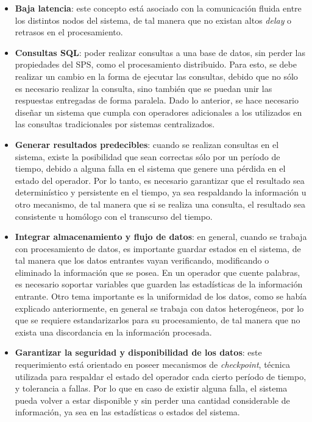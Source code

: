 \begin{itemize}
	\item \textbf{Baja latencia}: este concepto está asociado con la comunicación fluida entre los distintos nodos del sistema, de tal manera que no existan altos \textit{delay} o retrasos en el procesamiento.
	\item \textbf{Consultas SQL}: poder realizar consultas a una base de datos, sin perder las propiedades del SPS, como el procesamiento distribuido. Para esto, se debe realizar un cambio en la forma de ejecutar las consultas, debido que no sólo es necesario realizar la consulta, sino también que se puedan unir las respuestas entregadas de forma paralela. Dado lo anterior, se hace necesario diseñar un sistema que cumpla con operadores adicionales a los utilizados en las consultas tradicionales por sistemas centralizados.
	\item \textbf{Generar resultados predecibles}: cuando se realizan consultas en el sistema, existe la posibilidad que sean correctas sólo por un período de tiempo, debido a alguna falla en el sistema que genere una pérdida en el estado del operador. Por lo tanto, es necesario garantizar que el resultado sea determinístico y persistente en el tiempo, ya sea respaldando la información u otro mecanismo, de tal manera que si se realiza una consulta, el resultado sea consistente u homólogo con el transcurso del tiempo.
	\item \textbf{Integrar almacenamiento y flujo de datos}: en general, cuando se trabaja con procesamiento de datos, es importante guardar estados en el sistema, de tal manera que los datos entrantes vayan verificando, modificando o eliminado la información que se posea. En un operador que cuente palabras, es necesario soportar variables que guarden las estadísticas de la información entrante. Otro tema importante es la uniformidad de los datos, como se había explicado anteriormente, en general se trabaja con datos heterogéneos, por lo que se requiere estandarizarlos para su procesamiento, de tal manera que no exista una discordancia en la información procesada.
	\item \textbf{Garantizar la seguridad y disponibilidad de los datos}: este requerimiento está orientado en poseer mecanismos de \textit{checkpoint}, técnica utilizada para respaldar el estado del operador cada cierto período de tiempo, y tolerancia a fallas. Por lo que en caso de existir alguna falla, el sistema pueda volver a estar disponible y sin perder una cantidad considerable de información, ya sea en las estadísticas o estados del sistema.

\end{itemize}
